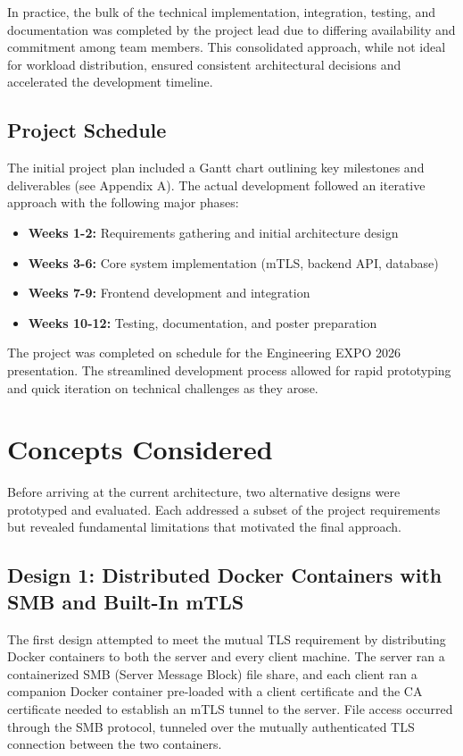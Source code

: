 \documentclass[12pt,letterpaper]{report}
\begin{document}
In practice, the bulk of the technical implementation, integration, testing, and documentation was completed by the project lead due to differing availability and commitment among team members. This consolidated approach, while not ideal for workload distribution, ensured consistent architectural decisions and accelerated the development timeline.

\section{Project Schedule}

The initial project plan included a Gantt chart outlining key milestones and deliverables (see Appendix A). The actual development followed an iterative approach with the following major phases:

\begin{itemize}
    \item \textbf{Weeks 1-2:} Requirements gathering and initial architecture design
    \item \textbf{Weeks 3-6:} Core system implementation (mTLS, backend API, database)
    \item \textbf{Weeks 7-9:} Frontend development and integration
    \item \textbf{Weeks 10-12:} Testing, documentation, and poster preparation
\end{itemize}

The project was completed on schedule for the Engineering EXPO 2026 presentation. The streamlined development process allowed for rapid prototyping and quick iteration on technical challenges as they arose.

\chapter{Concepts Considered}

Before arriving at the current architecture, two alternative designs were prototyped and evaluated. Each addressed a subset of the project requirements but revealed fundamental limitations that motivated the final approach.

\section{Design 1: Distributed Docker Containers with SMB and Built-In mTLS}

The first design attempted to meet the mutual TLS requirement by distributing Docker containers to both the server and every client machine. The server ran a containerized SMB (Server Message Block) file share, and each client ran a companion Docker container pre-loaded with a client certificate and the CA certificate needed to establish an mTLS tunnel to the server. File access occurred through the SMB protocol, tunneled over the mutually authenticated TLS connection between the two containers.
\end{document}
